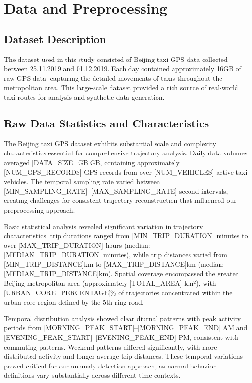 \documentclass[runningheads]{llncs}
\begin{document}
\section{Data and Preprocessing}
\label{sec:data-preprocessing}

\subsection{Dataset Description}
\label{sec:data}

The dataset used in this study consisted of Beijing taxi GPS data collected between 25.11.2019 and 01.12.2019. Each day contained approximately 16GB of raw GPS data, capturing the detailed movements of taxis throughout the metropolitan area. This large-scale dataset provided a rich source of real-world taxi routes for analysis and synthetic data generation.

\subsection{Raw Data Statistics and Characteristics}
\label{sec:raw-data}
The Beijing taxi GPS dataset exhibits substantial scale and complexity characteristics essential for comprehensive trajectory analysis. Daily data volumes averaged [DATA\_SIZE\_GB]GB, containing approximately [NUM\_GPS\_RECORDS] GPS records from over [NUM\_VEHICLES] active taxi vehicles. The temporal sampling rate varied between [MIN\_SAMPLING\_RATE]--[MAX\_SAMPLING\_RATE] second intervals, creating challenges for consistent trajectory reconstruction that influenced our preprocessing approach.

Basic statistical analysis revealed significant variation in trajectory characteristics: trip durations ranged from [MIN\_TRIP\_DURATION] minutes to over [MAX\_TRIP\_DURATION] hours (median: [MEDIAN\_TRIP\_DURATION] minutes), while trip distances varied from [MIN\_TRIP\_DISTANCE]km to [MAX\_TRIP\_DISTANCE]km (median: [MEDIAN\_TRIP\_DISTANCE]km). Spatial coverage encompassed the greater Beijing metropolitan area (approximately [TOTAL\_AREA] km²), with [URBAN\_CORE\_PERCENTAGE]\% of trajectories concentrated within the urban core region defined by the 5th ring road.

Temporal distribution analysis showed clear diurnal patterns with peak activity periods from [MORNING\_PEAK\_START]--[MORNING\_PEAK\_END] AM and [EVENING\_PEAK\_START]--[EVENING\_PEAK\_END] PM, consistent with commuting patterns. Weekend patterns differed significantly, with more distributed activity and longer average trip distances. These temporal variations proved critical for our anomaly detection approach, as normal behavior definitions vary substantially across different time contexts.
\end{document}
